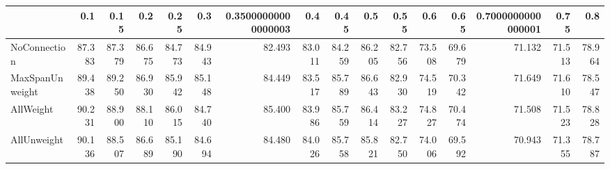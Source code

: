 \begin{tabular}{lrrrrrrrrrrrrrrr}
\toprule
{} &    0.1 &   0.15 &    0.2 &   0.25 &    0.3 & 0.35000000000000003 &    0.4 &   0.45 &    0.5 &   0.55 &    0.6 &   0.65 & 0.7000000000000001 &   0.75 &    0.8 \\
\midrule
NoConnection    & 87.383 & 87.379 & 86.675 & 84.773 & 84.943 &              82.493 & 83.011 & 84.259 & 86.205 & 82.756 & 73.508 & 69.679 &             71.132 & 71.513 & 78.964 \\
MaxSpanUnweight & 89.438 & 89.250 & 86.930 & 85.942 & 85.148 &              84.449 & 83.517 & 85.789 & 86.643 & 82.930 & 74.519 & 70.342 &             71.649 & 71.610 & 78.547 \\
AllWeight       & 90.231 & 88.900 & 88.110 & 86.015 & 84.740 &              85.400 & 83.986 & 85.759 & 86.414 & 83.227 & 74.827 & 70.474 &             71.508 & 71.523 & 78.828 \\
AllUnweight     & 90.136 & 88.507 & 86.689 & 85.190 & 84.694 &              84.480 & 84.026 & 85.758 & 85.821 & 82.750 & 74.006 & 69.592 &             70.943 & 71.355 & 78.787 \\
\bottomrule
\end{tabular}
